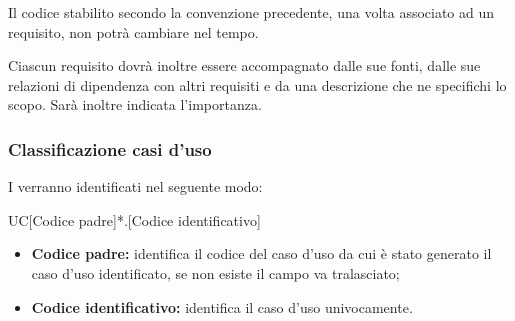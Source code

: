 \documentclass[../NomeDocumento.tex]{subfiles}
\begin{document}
	\noindent Il codice stabilito secondo la convenzione precedente, una volta associato ad un requisito, non potrà cambiare nel tempo.
	
	\noindent Ciascun requisito dovrà inoltre essere accompagnato dalle sue fonti, dalle sue relazioni di dipendenza con altri requisiti e da una descrizione che ne specifichi lo scopo. Sarà inoltre indicata l'importanza.
	
	
	
		
	\subsubsection{Classificazione casi d’uso} 
	
	I  verranno identificati nel seguente modo: 
	
	\begin{center}
		UC[Codice padre]*.[Codice identificativo]
	\end{center}
	
	\begin{itemize}
		\item \textbf{Codice padre:} identifica il codice del caso d'uso da cui è stato generato il caso d'uso identificato, se non esiste il campo va tralasciato;
		\item \textbf{Codice identificativo:} identifica il caso d'uso univocamente.
	\end{itemize}
\end{document}
